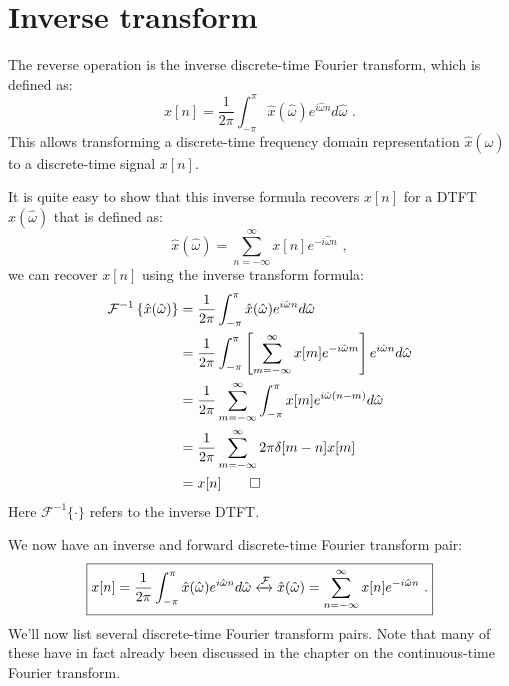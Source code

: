 \section{Inverse transform}
The reverse operation is the inverse discrete-time Fourier transform,
which is defined as:
\begin{equation}
\boxed{
x[n] = \frac{1}{2\pi}\int_{-\pi}^{\pi} \hat{x}(\hat{\omega})e^{i\hat{\omega}n} d\hat{\omega}\,\,.
\label{eq:idtft_def}
}
\end{equation}
This allows transforming a discrete-time frequency domain
representation $\hat{x}(\hat{\omega})$ to a discrete-time signal $x[n]$.

It is quite easy to show that this inverse formula recovers $x[n]$ for
a DTFT $\hat{x}(\hat{\omega})$ that is defined as:
\begin{equation}
\hat{x}(\hat{\omega}) = \sum_{n=-\infty}^{\infty} x[n] e^{-i\hat{\omega} n}\,\,,
\end{equation}
we can recover $x[n]$ using the inverse transform formula:
\begin{align}
\mathcal{F}^{-1}\left\{\hat{x}(\hat{\omega})\right\} &=\frac{1}{2\pi}\int_{-\pi}^{\pi} \hat{x}(\hat{\omega})e^{i\hat{\omega}n} d\hat{\omega} \\
     &=\frac{1}{2\pi}\int_{-\pi}^{\pi} \left[\sum_{m=-\infty}^{\infty} x[m]e^{-i\hat{\omega}m} \right] e^{i\hat{\omega}n} d\hat{\omega}\\
     &=\frac{1}{2\pi}\sum_{m=-\infty}^{\infty} \int_{-\pi}^{\pi} x[m]e^{i\hat{\omega}(n-m)} d\hat{\omega}\\
     &=\frac{1}{2\pi}\sum_{m=-\infty}^{\infty} 2\pi \delta[m-n] x[m]\\
     &=x[n]\qed
\end{align}
Here $\mathcal{F}^{-1}\{\cdot\}$ refers to the inverse DTFT.

We now have an inverse and forward discrete-time Fourier transform pair:
\begin{equation}
  \boxed{
    x[n] = \frac{1}{2\pi}\int_{-\pi}^{\pi} \hat{x}(\hat{\omega})e^{i\hat{\omega}n} d\hat{\omega} \xleftrightarrow{\mathcal{F}} 
    \hat{x}(\hat{\omega}) = \sum_{n=-\infty}^{\infty} x[n] e^{-i\hat{\omega}n}\,\,.
    }
\end{equation}
We'll now list several discrete-time Fourier transform pairs. Note
that many of these have in fact already been discussed in the chapter
on the continuous-time Fourier transform.


